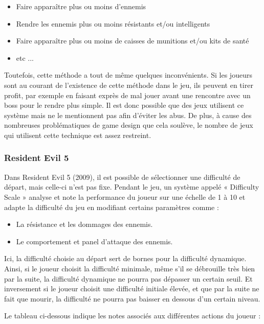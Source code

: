 \documentclass[a4paper, 12pt]{article} %
\begin{document}
\begin{itemize}
	\item Faire apparaître plus ou moins d’ennemis
	\item Rendre les ennemis plus ou moins résistants et/ou intelligents
	\item Faire apparaître plus ou moins de caisses de munitions et/ou kits de santé
	\item etc ...
\end{itemize}

Toutefois, cette méthode a tout de même quelques inconvénients. Si les joueurs sont au courant de l'existence de cette méthode dans le jeu, ils peuvent en tirer profit, par exemple en faisant exprès de mal jouer avant une rencontre avec un boss pour le rendre plus simple. Il est donc possible que des jeux utilisent ce système mais ne le mentionnent pas afin d'éviter les abus. De plus, à cause des nombreuses problématiques de game design que cela soulève, le nombre de jeux qui utilisent cette technique est assez restreint.

\newpage
\subsubsection{Resident Evil 5}

Dans Resident Evil 5 (2009), il est possible de sélectionner une difficulté de départ, mais celle-ci n’est pas fixe. Pendant le jeu, un système appelé « Difficulty Scale » analyse et note la performance du joueur sur une échelle de 1 à 10 et adapte la difficulté du jeu en modifiant certains paramètres comme :

\begin{itemize}
	\item La résistance et les dommages des ennemis.
	\item Le comportement et panel d'attaque des ennemis.
\end{itemize}

Ici, la difficulté choisie au départ sert de bornes pour la difficulté dynamique. Ainsi, si le joueur choisit la difficulté minimale, même s’il se débrouille très bien par la suite, la difficulté dynamique ne pourra pas dépasser un certain seuil. Et inversement si le joueur choisit une difficulté initiale élevée, et que par la suite ne fait que mourir, la difficulté ne pourra pas baisser en dessous d’un certain niveau.

Le tableau ci-dessous indique les notes associés aux différentes actions du joueur :
\end{document}

